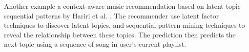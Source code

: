 Another example a context-aware music recommendation based on latent topic sequential patterns by Hariri et al. \cite{hariri2012context}. The recommender use latent factor techniques to discover latent topics, and sequential pattern mining techniques to reveal the relationship between these topics. The prediction then predicts the next topic using a sequence of song in user's current playlist. 

